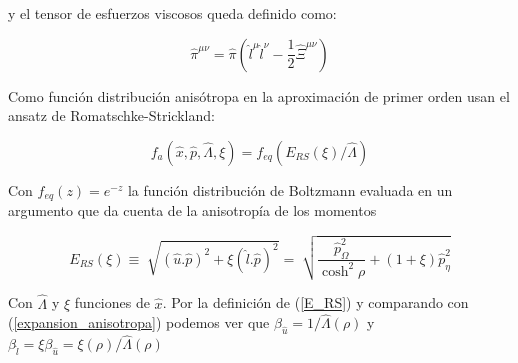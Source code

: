 \documentclass[11pt,a4paper]{article}
\begin{document}
 y el tensor de esfuerzos viscosos queda definido como:
 
\begin{equation}
\hat{\pi}^{{\mu}{\nu}}= 
\hat{\pi}(\hat{l}^{\mu}\hat{l}^{\nu}-\frac{1}{2}\hat{\Xi}^{{\mu}{\nu}})
\label{shear_gubser}
 \end{equation}

Como función distribución anisótropa en la aproximación de primer orden usan el ansatz  de Romatschke-Strickland:

\begin{equation}
f_{a}(\hat{x},\hat{p},\hat{\Lambda},\xi)=
f_{eq}(E_{RS}(\xi)/{\hat{\Lambda}})
\label{Romatschke_Strickland}
\end{equation}
 
 Con $f_{eq}(z)=e^{-z}$ la función distribución de Boltzmann evaluada en un argumento que da cuenta de la anisotropía de los momentos
 
 \begin{equation}
 E_{RS}(\xi)\equiv\sqrt[]{(\hat{u}.\hat{p})^2+\xi(\hat{l}.\hat{p})^2}=\sqrt[]{\frac{\hat{p}^2_{\Omega}}{\cosh^2\rho}+(1+\xi)\hat{p}^2_{\eta}}
 \label{E_RS}
 \end{equation}
 
 Con $\hat{\Lambda}$ y $\xi$ funciones de $\hat{x}$. Por la definición de (\ref{E_RS}) y comparando con (\ref{expansion_anisotropa}) podemos ver que $\beta_{\hat{u}}=1/\hat{\Lambda}(\rho)$ y $\beta_{\hat{l}}=\xi\beta_{\hat{u}}=\xi(\rho)/\hat{\Lambda}(\rho)$









\end{document}
